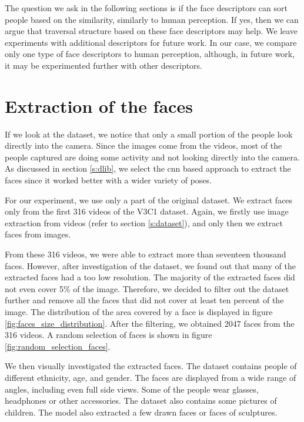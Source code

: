 The question we ask in the following sections is if the face descriptors can sort people based on the similarity, similarly to human perception. If yes, then we can argue that traversal structure based on these face descriptors may help. We leave experiments with additional descriptors for future work. In our case, we compare only one type of face descriptors to human perception, although, in future work, it may be experimented further with other descriptors.

\section{Extraction of the faces}

If we look at the dataset, we notice that only a small portion of the people look directly into the camera. Since the images come from the videos, most of the people captured are doing some activity and not looking directly into the camera. As discussed in section \ref{s:dlib}, we select the \acrshort{cnn} based approach to extract the faces since it worked better with a wider variety of poses.

For our experiment, we use only a part of the original dataset. We extract faces only from the first 316 videos of the V3C1 dataset. Again, we firstly use image extraction from videos (refer to section \ref{s:dataset}), and only then we extract faces from images. 

From these 316 videos, we were able to extract more than seventeen thousand faces. However, after investigation of the dataset, we found out that many of the extracted faces had a too low resolution. The majority of the extracted faces did not even cover 5\% of the image. Therefore, we decided to filter out the dataset further and remove all the faces that did not cover at least ten percent of the image. The distribution of the area covered by a face is displayed in figure \ref{fig:faces_size_distribution}. After the filtering,  we obtained 2047 faces from the 316 videos. A random selection of faces is shown in figure \ref{fig:random_selection_faces}. 

We then visually investigated the extracted faces. The dataset contains people of different ethnicity, age, and gender. The faces are displayed from a wide range of angles, including even full side views. Some of the people wear glasses, headphones or other accessories. The dataset also contains some pictures of children. The model also extracted a few drawn faces or faces of sculptures.

